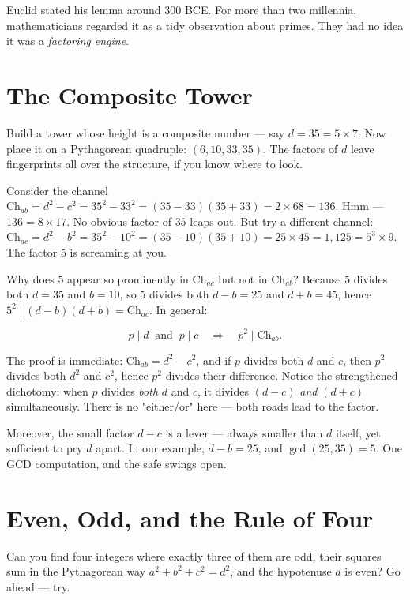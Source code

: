 \documentclass[11pt,twoside,openright]{book}
\theoremstyle{definition}
\theoremstyle{remark}
\begin{document}
Euclid stated his lemma around 300 BCE. For more than two millennia, mathematicians regarded it as a tidy observation about primes. They had no idea it was a \textit{factoring engine}.



\section{The Composite Tower}

Build a tower whose height is a composite number --- say $d = 35 = 5 \times 7$. Now place it on a Pythagorean quadruple: $(6, 10, 33, 35)$. The factors of $d$ leave fingerprints all over the structure, if you know where to look.

Consider the channel $\mathrm{Ch}_{ab} = d^2 - c^2 = 35^2 - 33^2 = (35 - 33)(35 + 33) = 2 \times 68 = 136$. Hmm --- $136 = 8 \times 17$. No obvious factor of $35$ leaps out. But try a different channel: $\mathrm{Ch}_{ac} = d^2 - b^2 = 35^2 - 10^2 = (35 - 10)(35 + 10) = 25 \times 45 = 1{,}125 = 5^3 \times 9$. The factor $5$ is screaming at you.

Why does $5$ appear so prominently in $\mathrm{Ch}_{ac}$ but not in $\mathrm{Ch}_{ab}$? Because $5$ divides both $d = 35$ and $b = 10$, so $5$ divides both $d - b = 25$ and $d + b = 45$, hence $5^2 \mid (d - b)(d + b) = \mathrm{Ch}_{ac}$. In general:

\[p \mid d \;\;\text{and}\;\; p \mid c \quad \Longrightarrow \quad p^2 \mid \mathrm{Ch}_{ab}.\]

The proof is immediate: $\mathrm{Ch}_{ab} = d^2 - c^2$, and if $p$ divides both $d$ and $c$, then $p^2$ divides both $d^2$ and $c^2$, hence $p^2$ divides their difference. Notice the strengthened dichotomy: when $p$ divides \textit{both} $d$ and $c$, it divides $(d - c)$ \textit{and} $(d + c)$ simultaneously. There is no "either/or" here --- both roads lead to the factor.

Moreover, the small factor $d - c$ is a lever --- always smaller than $d$ itself, yet sufficient to pry $d$ apart. In our example, $d - b = 25$, and $\gcd(25, 35) = 5$. One GCD computation, and the safe swings open.



\section{Even, Odd, and the Rule of Four}

Can you find four integers where exactly three of them are odd, their squares sum in the Pythagorean way $a^2 + b^2 + c^2 = d^2$, and the hypotenuse $d$ is even? Go ahead --- try.
\end{document}
